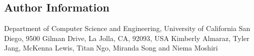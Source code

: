 \documentclass[twocolumn]{bmcart}%
\begin{document}
\begin{multicols}
\begin{backmatter}
\section*{Author Information}
    Department of Computer Science and Engineering, University of California San Diego, 9500 Gilman Drive, La Jolla, CA, 92093, USA
    \newline
    Kimberly Almaraz, Tyler Jang, McKenna Lewis, Titan Ngo, Miranda Song and Niema Moshiri




%


\end{backmatter}
\end{multicols}
\end{document}
